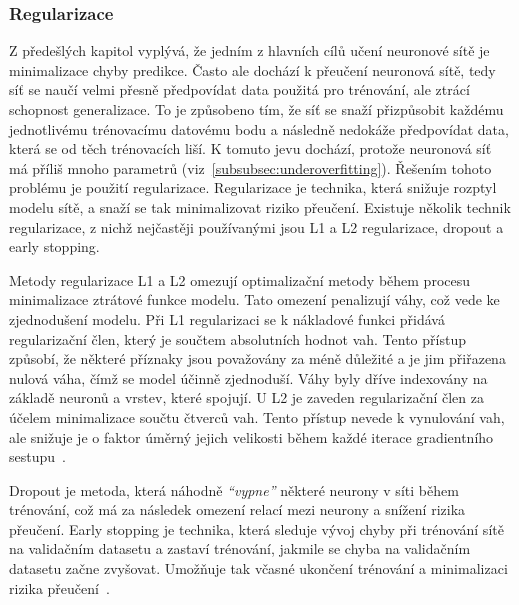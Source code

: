 \subsubsection{Regularizace}
Z předešlých kapitol vyplývá, že jedním z hlavních cílů učení neuronové sítě je
minimalizace chyby predikce. Často ale dochází k přeučení neuronová sítě, tedy
síť se naučí velmi přesně předpovídat data použitá pro trénování, ale ztrácí
schopnost generalizace. To je způsobeno tím, že síť se snaží přizpůsobit každému
jednotlivému trénovacímu datovému bodu a následně nedokáže předpovídat data,
která se od těch trénovacích liší. K tomuto jevu dochází, protože neuronová síť
má příliš mnoho parametrů (viz~\ref{subsubsec:underoverfitting}). Řešením tohoto
problému je použití regularizace. Regularizace je technika, která snižuje
rozptyl modelu sítě, a snaží se tak minimalizovat riziko přeučení. Existuje
několik technik regularizace, z nichž nejčastěji používanými jsou L1 a L2
regularizace, dropout a early stopping.

Metody regularizace L1 a L2 omezují optimalizační metody během procesu
minimalizace ztrátové funkce modelu. Tato omezení penalizují váhy, což vede ke
zjednodušení modelu. Při L1 regularizaci se k nákladové funkci přidává
regularizační člen, který je součtem absolutních hodnot vah. Tento přístup
způsobí, že některé příznaky jsou považovány za méně důležité a je jim přiřazena
nulová váha, čímž se model účinně zjednoduší. Váhy byly dříve indexovány na
základě neuronů a vrstev, které spojují. U L2 je zaveden regularizační člen za
účelem minimalizace součtu čtverců vah. Tento přístup nevede k vynulování vah,
ale snižuje je o faktor úměrný jejich velikosti během každé iterace gradientního
sestupu~\cite{Aurelien2022,Goodfellow2016}.

Dropout je metoda, která náhodně \emph{\enquote{vypne}} některé neurony v síti
během trénování, což má za následek omezení relací mezi neurony a snížení rizika
přeučení. Early stopping je technika, která sleduje vývoj chyby při trénování
sítě na validačním datasetu a zastaví trénování, jakmile se chyba na validačním
datasetu začne zvyšovat. Umožňuje tak včasné ukončení trénování a minimalizaci
rizika přeučení~\cite{Aurelien2022,Goodfellow2016}.